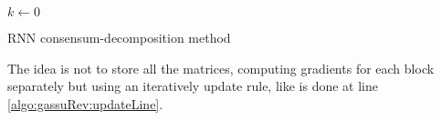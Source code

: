\documentclass{article}
\begin{document}
\begin{algorithm}[]
	$k \gets 0$\\
	\caption{RNN consensum-decomposition method}
	\label{algo:gaussSeidelRevised}
\end{algorithm}

The idea is not to store all the matrices, computing gradients for each block separately but using an iteratively update rule, like is done at line \ref{algo:gassuRev:updateLine}.
	
	
\end{document}
